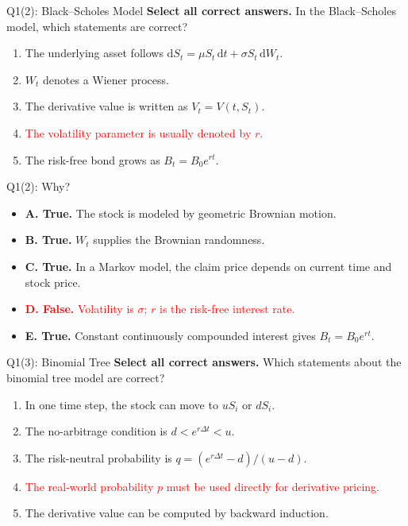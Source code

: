 \documentclass{beamer}
\newcommand{\dd}{\mathrm{d}}
\newcommand{\wrong}[1]{\textcolor{red}{#1}}
\begin{document}
\begin{frame}{Q1(2): Black--Scholes Model}
\small
\textbf{Select all correct answers.} In the Black--Scholes model,
which statements are correct?
\begin{enumerate}
\item[A.] The underlying asset follows
$\dd S_t=\mu S_t\,\dd t+\sigma S_t\,\dd W_t$.
\item[B.] $W_t$ denotes a Wiener process.
\item[C.] The derivative value is written as $V_t=V(t,S_t)$.
\item[\wrong{D.}] \wrong{The volatility parameter is usually denoted by $r$.}
\item[E.] The risk-free bond grows as $B_t=B_0e^{rt}$.
\end{enumerate}
\end{frame}

\begin{frame}{Q1(2): Why?}
\small
\begin{itemize}
\item \textbf{A. True.} The stock is modeled by geometric Brownian motion.
\item \textbf{B. True.} $W_t$ supplies the Brownian randomness.
\item \textbf{C. True.} In a Markov model, the claim price depends on
current time and stock price.
\item \wrong{\textbf{D. False.} Volatility is $\sigma$; $r$ is the
risk-free interest rate.}
\item \textbf{E. True.} Constant continuously compounded interest
gives $B_t=B_0e^{rt}$.
\end{itemize}
\end{frame}

\begin{frame}{Q1(3): Binomial Tree}
\small
\textbf{Select all correct answers.} Which statements about the
binomial tree model are correct?
\begin{enumerate}
\item[A.] In one time step, the stock can move to $uS_i$ or $dS_i$.
\item[B.] The no-arbitrage condition is $d<e^{r\Delta t}<u$.
\item[C.] The risk-neutral probability is
$q=(e^{r\Delta t}-d)/(u-d)$.
\item[\wrong{D.}] \wrong{The real-world probability $p$ must be used
directly for derivative pricing.}
\item[E.] The derivative value can be computed by backward induction.
\end{enumerate}
\end{frame}
\end{document}
